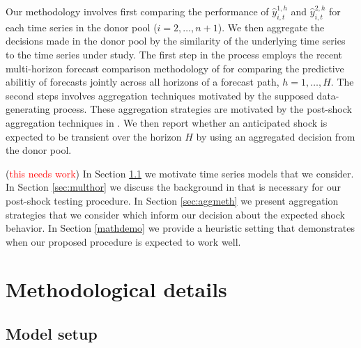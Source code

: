 \documentclass[11pt]{article}
\theoremstyle{definition}
\begin{document}
Our methodology involves first comparing the performance of $\hat y^{1,h}_{i,t}$ and $\hat y^{2,h}_{i,t}$ for each time series in the donor pool ($i = 2,\ldots,n+1$). We then aggregate the decisions made in the donor pool by the similarity of the underlying time series to the time series under study. The first step in the process employs the recent multi-horizon forecast comparison methodology of \cite{quaedvlieg2021multi} for comparing the predictive abilitiy of forecasts jointly across all horizons of a forecast path, $h = 1,\ldots, H$. The second steps involves aggregation techniques motivated by the supposed data-generating process. These aggregation strategies are motivated by the post-shock aggregation techniques in \cite{lin2021minimizing}. We then report whether an anticipated shock is expected to be transient over the horizon $H$ by using an aggregated decision from the donor pool.

(\textcolor{red}{this needs work}) In Section \ref{modelsetup} we motivate time series models that we consider. In Section \ref{sec:multhor} we discuss the background in \cite{quaedvlieg2021multi} that is necessary for our post-shock testing procedure. In Section \ref{sec:aggmeth} we present aggregation strategies that we consider which inform our decision about the expected shock behavior. In Section \ref{mathdemo} we provide a heuristic setting that demonstrates when our proposed procedure is expected to work well.









\section{Methodological details}


\subsection{Model setup}
\label{modelsetup}
\end{document}

